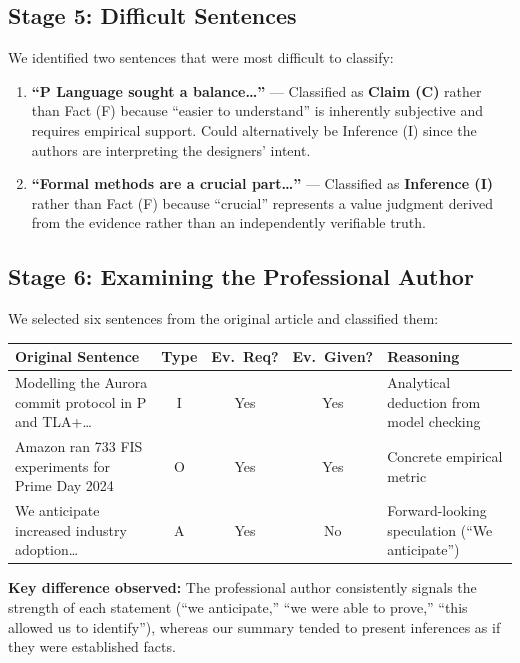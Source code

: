 \documentclass[11pt, a4paper]{article}
\begin{document}
\subsection{Stage 5: Difficult Sentences}
We identified two sentences that were most difficult to classify:

\begin{enumerate}[nosep]
    \item \textbf{``P Language sought a balance\ldots''} --- Classified as \textbf{Claim (C)} rather than Fact (F) because ``easier to understand'' is inherently subjective and requires empirical support. Could alternatively be Inference (I) since the authors are interpreting the designers' intent.
    
    \item \textbf{``Formal methods are a crucial part\ldots''} --- Classified as \textbf{Inference (I)} rather than Fact (F) because ``crucial'' represents a value judgment derived from the evidence rather than an independently verifiable truth.
\end{enumerate}

\subsection{Stage 6: Examining the Professional Author}
We selected six sentences from the original article and classified them:

\begin{longtable}{@{}p{5cm} c c c p{4.5cm}@{}}
    \toprule
    \textbf{Original Sentence} & \textbf{Type} & \textbf{Ev.\ Req?} & \textbf{Ev.\ Given?} & \textbf{Reasoning} \\
    \midrule
    \endhead
    Modelling the Aurora commit protocol in P and TLA+\ldots & I & Yes & Yes & Analytical deduction from model checking \\
    Amazon ran 733 FIS experiments for Prime Day 2024 & O & Yes & Yes & Concrete empirical metric \\
    We anticipate increased industry adoption\ldots & A & Yes & No & Forward-looking speculation (``We anticipate'') \\
    \bottomrule
\end{longtable}

\noindent\textbf{Key difference observed:} The professional author consistently signals the strength of each statement (``we anticipate,'' ``we were able to prove,'' ``this allowed us to identify''), whereas our summary tended to present inferences as if they were established facts.
\end{document}
